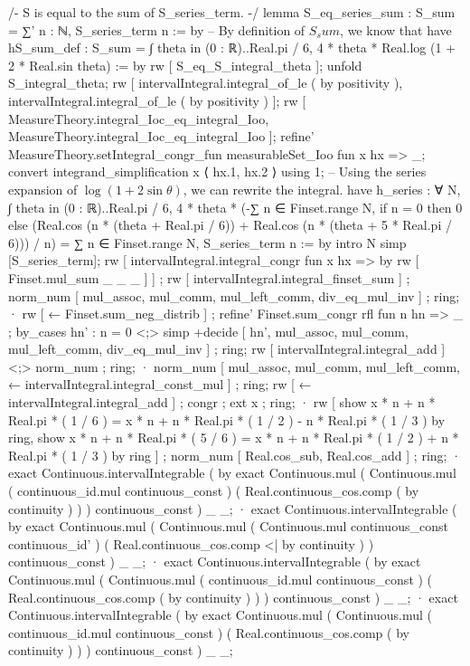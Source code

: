 /-
S is equal to the sum of S_series_term.
-/
lemma S_eq_series_sum : S_sum = ∑' n : ℕ, S_series_term n := by
  -- By definition of $S_sum$, we know that
  have hS_sum_def : S_sum = ∫ theta in (0 : ℝ)..Real.pi / 6, 4 * theta * Real.log (1 + 2 * Real.sin theta) := by
    rw [ S_eq_S_integral_theta ];
    unfold S_integral_theta;
    rw [ intervalIntegral.integral_of_le ( by positivity ), intervalIntegral.integral_of_le ( by positivity ) ];
    rw [ MeasureTheory.integral_Ioc_eq_integral_Ioo, MeasureTheory.integral_Ioc_eq_integral_Ioo ];
    refine' MeasureTheory.setIntegral_congr_fun measurableSet_Ioo fun x hx => _;
    convert integrand_simplification x ⟨ hx.1, hx.2 ⟩ using 1;
  -- Using the series expansion of $\log(1 + 2\sin\theta)$, we can rewrite the integral.
  have h_series : ∀ N, ∫ theta in (0 : ℝ)..Real.pi / 6, 4 * theta * (-∑ n ∈ Finset.range N, if n = 0 then 0 else (Real.cos (n * (theta + Real.pi / 6)) + Real.cos (n * (theta + 5 * Real.pi / 6))) / n) = ∑ n ∈ Finset.range N, S_series_term n := by
    intro N
    simp [S_series_term];
    rw [ intervalIntegral.integral_congr fun x hx => by rw [ Finset.mul_sum _ _ _ ] ] ; rw [ intervalIntegral.integral_finset_sum ] ; norm_num [ mul_assoc, mul_comm, mul_left_comm, div_eq_mul_inv ] ; ring;
    · rw [ ← Finset.sum_neg_distrib ] ; refine' Finset.sum_congr rfl fun n hn => _ ; by_cases hn' : n = 0 <;> simp +decide [ hn', mul_assoc, mul_comm, mul_left_comm, div_eq_mul_inv ] ; ring;
      rw [ intervalIntegral.integral_add ] <;> norm_num ; ring;
      · norm_num [ mul_assoc, mul_comm, mul_left_comm, ← intervalIntegral.integral_const_mul ] ; ring;
        rw [ ← intervalIntegral.integral_add ] ; congr ; ext x ; ring;
        · rw [ show x * n + n * Real.pi * ( 1 / 6 ) = x * n + n * Real.pi * ( 1 / 2 ) - n * Real.pi * ( 1 / 3 ) by ring, show x * n + n * Real.pi * ( 5 / 6 ) = x * n + n * Real.pi * ( 1 / 2 ) + n * Real.pi * ( 1 / 3 ) by ring ] ; norm_num [ Real.cos_sub, Real.cos_add ] ; ring;
        · exact Continuous.intervalIntegrable ( by exact Continuous.mul ( Continuous.mul ( continuous_id.mul continuous_const ) ( Real.continuous_cos.comp ( by continuity ) ) ) continuous_const ) _ _;
        · exact Continuous.intervalIntegrable ( by exact Continuous.mul ( Continuous.mul ( Continuous.mul continuous_const continuous_id' ) ( Real.continuous_cos.comp <| by continuity ) ) continuous_const ) _ _;
      · exact Continuous.intervalIntegrable ( by exact Continuous.mul ( Continuous.mul ( continuous_id.mul continuous_const ) ( Real.continuous_cos.comp ( by continuity ) ) ) continuous_const ) _ _;
      · exact Continuous.intervalIntegrable ( by exact Continuous.mul ( Continuous.mul ( continuous_id.mul continuous_const ) ( Real.continuous_cos.comp ( by continuity ) ) ) continuous_const ) _ _;
